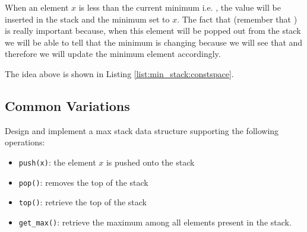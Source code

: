 When an element $x$ is less than the current minimum i.e. , the value  will be inserted in the stack and the minimum set to $x$. The fact that  (remember that ) is really important because, when this element will be popped out from the stack we will be able to tell that the minimum is changing because we will see that  and therefore we will update the minimum element accordingly.

The idea above is shown in Listing \ref{list:min_stack:constspace}.

 

\subsection{Common Variations}
\begin{exercise}
	 Design and implement a max stack data structure supporting the following operations:
	\begin{itemize}
		\item \lstinline[columns=fixed]{push(x)}: the element $x$ is pushed onto the stack
		\item \lstinline[columns=fixed]{pop()}: removes the top of the stack
		\item \lstinline[columns=fixed]{top()}: retrieve the top of the stack
		\item \lstinline[columns=fixed]{get_max()}: retrieve the maximum among all elements present in the stack.
	\end{itemize}

\end{exercise}